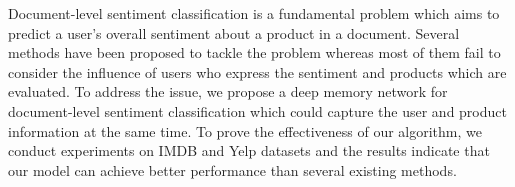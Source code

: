 Document-level sentiment classification is a fundamental problem which aims to predict a user's overall sentiment about a product in a document. Several methods have been proposed to tackle the problem whereas most of them fail to consider the influence of users who express the sentiment and products which are evaluated. To address the issue, we propose a deep memory network for document-level sentiment classification which could capture the user and product information at the same time. To prove the effectiveness of our algorithm, we conduct experiments on IMDB and Yelp datasets and the results indicate that our model can achieve better performance than several existing methods.
